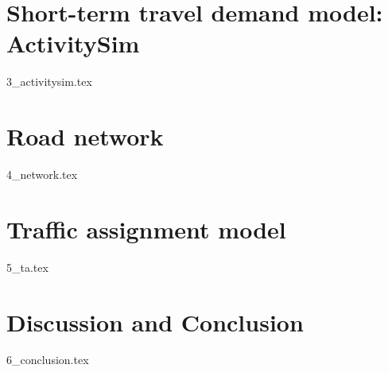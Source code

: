 \documentclass{report}
\begin{document}
\section{Short-term travel demand model: ActivitySim}
\label{sec:activitysim}
{3_activitysim.tex}

\section{Road network}
\label{sec:network}
{4_network.tex}

\section{Traffic assignment model}
\label{sec:ta}
{5_ta.tex}

\section{Discussion and Conclusion}
\label{sec:conclusion}
{6_conclusion.tex}

\printbibliography[title=References]
\end{document}

